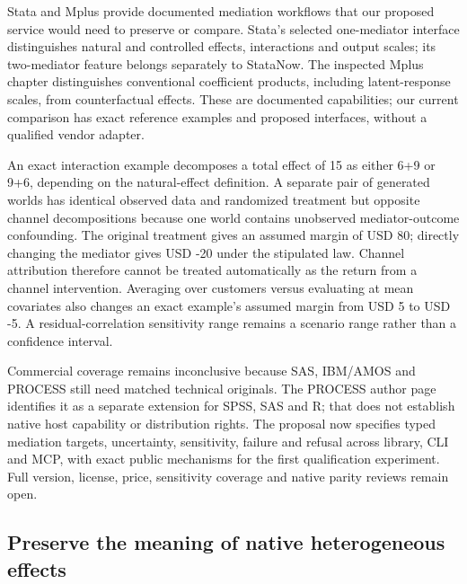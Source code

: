 Stata and Mplus provide documented mediation workflows that our proposed
service would need to preserve or compare. Stata's selected one-mediator
interface distinguishes natural and controlled effects, interactions and
output scales; its two-mediator feature belongs separately to StataNow.
The inspected Mplus chapter distinguishes conventional coefficient
products, including latent-response scales, from counterfactual effects.
These are documented capabilities; our current comparison has exact
reference examples and proposed interfaces, without a qualified vendor
adapter.\citep{exec20_med_stata_one,exec20_med_stata_intro,exec20_med_stata_post,exec20_med_stata_multiple,exec20_med_mplus_ch17}

An exact interaction example decomposes a total effect of 15 as either
6+9 or 9+6, depending on the natural-effect definition. A separate pair
of generated worlds has identical observed data and randomized treatment
but opposite channel decompositions because one world contains
unobserved mediator-outcome confounding. The original treatment gives an
assumed margin of USD 80; directly changing the mediator gives USD -20
under the stipulated law. Channel attribution therefore cannot be
treated automatically as the return from a channel intervention.
Averaging over customers versus evaluating at mean covariates also
changes an exact example's assumed margin from USD 5 to USD -5. A
residual-correlation sensitivity range remains a scenario range rather
than a confidence interval.\citep{exec20_med_reference}

Commercial coverage remains inconclusive because SAS, IBM/AMOS and
PROCESS still need matched technical originals. The PROCESS author page
identifies it as a separate extension for SPSS, SAS and R; that does not
establish native host capability or distribution rights. The proposal
now specifies typed mediation targets, uncertainty, sensitivity, failure
and refusal across library, CLI and MCP, with exact public mechanisms
for the first qualification experiment. Full version, license, price,
sensitivity coverage and native parity reviews remain
open.\citep{exec20_med_process_lead}

\hypertarget{preserve-the-meaning-of-native-heterogeneous-effects}{%
\subsection{Preserve the meaning of native heterogeneous
effects}\label{preserve-the-meaning-of-native-heterogeneous-effects}}

